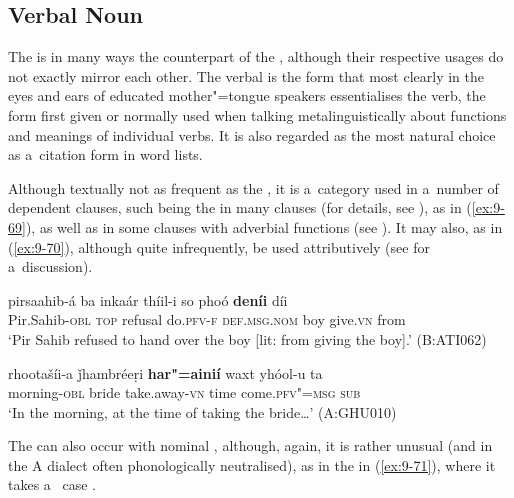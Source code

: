 \subsection{Verbal Noun}
\label{subsec:9-3-3}


The  is in many ways the  counterpart of the , although their respective usages do not exactly mirror each other. The verbal  is the form that most clearly in the eyes and ears of educated mother"=tongue speakers essentialises the verb, the form first given or normally used when talking metalinguistically about functions and meanings of individual verbs. It is also regarded as the most natural choice as a~citation form in word lists. 


Although textually not as frequent as the , it is a~category used in a~number of dependent clauses, such being the  in many  clauses (for details, see ), as in (\ref{ex:9-69}), as well as in some clauses with adverbial functions (see ). It may also, as in (\ref{ex:9-70}), although quite infrequently, be used attributively (see  for a~discussion).

\begin{exe}
\ex
\label{ex:9-69}
\gll pirsaahib-á ba inkaár thíil-i so phoó \textbf{deníi} díi \\
Pir.Sahib-\textsc{obl} \textsc{top} refusal do.\textsc{pfv-f} \textsc{def.msg.nom} boy give.\textsc{vn} from \\
\glt `Pir Sahib refused to hand over the boy [lit: from giving the boy].' (B:ATI062)
\end{exe}

\begin{exe}
\ex
\label{ex:9-70}
\gll rhootašíi-a ǰhambréeṛi \textbf{har"=ainií} waxt yhóol-u ta \\
morning-\textsc{obl} bride take.away-\textsc{vn} time come.\textsc{pfv"=msg} \textsc{sub} \\
\glt `In the morning, at the time of taking the bride{\ldots}' (A:GHU010)
\end{exe}

The  can also occur with nominal , although, again, it is rather unusual (and in the A dialect often phonologically neutralised), as in the   in (\ref{ex:9-71}), where it takes a~ case . 


